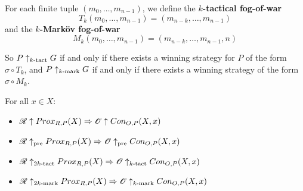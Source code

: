\begin{definition}
  For each finite tuple $(m_0,\dots,m_{n-1})$, we define the \textbf{$k$-tactical fog-of-war}
    \[
      T_k(m_0,\dots,m_{n-1})=(m_{n-k},\dots,m_{n-1})
    \]
  and the \textbf{$k$-Mark\"ov fog-of-war}
    \[
      M_k(m_0,\dots,m_{n-1})=(m_{n-k},\dots,m_{n-1},n)
    \]

  So $P\uparrow_{k\text{-tact}}G$ if and only if there exists a winning strategy for $P$ of the form $\sigma\circ T_k$, and $P\uparrow_{k\text{-mark}}G$ if and only if there exists a winning strategy of the form $\sigma\circ M_k$.
\end{definition}

\begin{theorem}
For all $x\in X$:
  \begin{itemize}
    \item
      $\mathscr{R}\uparrow Prox_{R,P}(X) \Rightarrow \mathscr{O} \uparrow Con_{O,P}(X,x)$
    \item
      $\mathscr{R}\uparrow_{\text{pre}} Prox_{R,P}(X) \Rightarrow \mathscr{O} \uparrow_{\text{pre}} Con_{O,P}(X,x)$
    \item
      $\mathscr{R}\uparrow_{2k\text{-tact}} Prox_{R,P}(X) \Rightarrow \mathscr{O} \uparrow_{k\text{-tact}} Con_{O,P}(X,x)$
    \item
      $\mathscr{R}\uparrow_{2k\text{-mark}} Prox_{R,P}(X) \Rightarrow \mathscr{O} \uparrow_{k\text{-mark}} Con_{O,P}(X,x)$
  \end{itemize}
\end{theorem}

